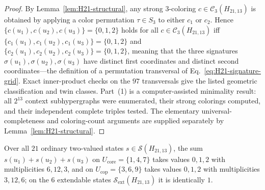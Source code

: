 \documentclass[aps,pra,reprint,superscriptaddress,longbibliography,nofootinbib,floatfix,10pt]{revtex4-2}
\theoremstyle{definition}\newtheorem{definition}[theorem]{Definition}
\theoremstyle{remark}\newtheorem{remark}[theorem]{Remark}
\newcommand{\Sc}{\mathcal S}\newcommand{\Cc}{\mathcal C}\newcommand{\Wc}{\mathcal W}
\begin{document}
\begin{proof}
By Lemma~\ref{lem:H21-structural}, any strong $3$-coloring $c\in\Cc_3(H_{21,13})$ is obtained by applying a color permutation $\tau\in S_3$ to either $c_1$ or $c_2$. Hence $\{c(u_1),c(u_2),c(u_3)\}=\{0,1,2\}$ holds for all $c\in\Cc_3(H_{21,13})$ iff $\{c_1(u_1),c_1(u_2),c_1(u_3)\}=\{0,1,2\}$ and $\{c_2(u_1),c_2(u_2),c_2(u_3)\}=\{0,1,2\}$, meaning that the three signatures $\sigma(u_1),\sigma(u_2),\sigma(u_3)$ have distinct first coordinates and distinct second coordinates---the definition of a permutation transversal of Eq.~\eqref{eq:H21-signature-grid}. Exact inner-product checks on the $97$ transversals give the listed geometric classification and twin classes. Part~(1) is a computer-assisted minimality result: all $2^{13}$ context subhypergraphs were enumerated, their strong colorings computed, and their independent complete triples tested. The elementary universal-completeness and coloring-count arguments are supplied separately by Lemma~\ref{lem:H21-structural}.
\end{proof}

Over all $21$ ordinary two-valued states $s\in\Sc(H_{21,13})$, the sum $s(u_1)+s(u_2)+s(u_3)$ on $U_{\mathrm{core}}=\{1,4,7\}$ takes values $0,1,2$ with multiplicities $6,12,3$, and on $U_{\mathrm{cop}}=\{3,6,9\}$ takes values $0,1,2$ with multiplicities $3,12,6$; on the $6$ extendable states $\Sc_{\mathrm{ext}}(H_{21,13})$ it is identically $1$.
\end{document}
